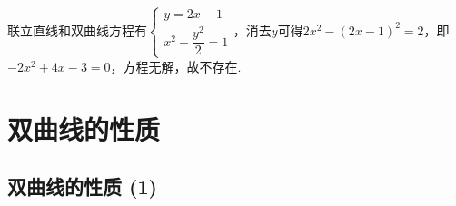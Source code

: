 \begin{enumerate}
\begin{jieda}
        联立直线和双曲线方程有$\left\{\begin{array}{l}
             y = 2x-1  \\
             {x}^{2} - \dfrac{{y}^{2}}{2} = 1
        \end{array}\right.$，消去$y$可得$2x^2-(2x-1)^2 = 2$，即$-2x^2+4x-3=0$，方程无解，故不存在.
    \end{jieda}

\end{enumerate}


\section*{双曲线的性质}

\subsection*{双曲线的性质 (1)}

